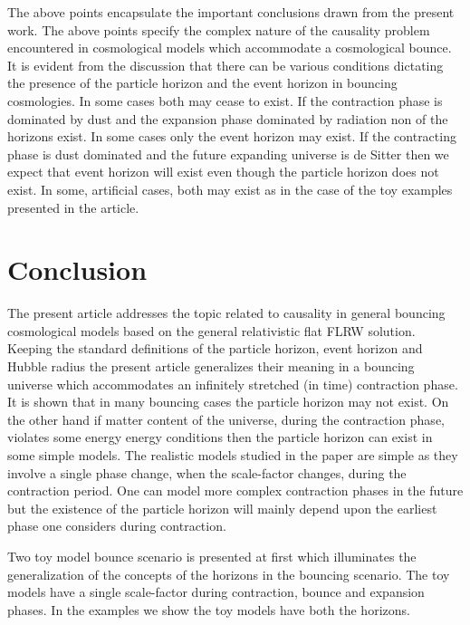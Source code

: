 \documentclass[24pt]{article}
\begin{document}
The above points encapsulate the important conclusions drawn from the
present work. The above points specify the complex nature of the
causality problem encountered in cosmological models which accommodate
a cosmological bounce. It is evident from the discussion that there
can be various conditions dictating the presence of the particle
horizon and the event horizon in bouncing cosmologies. In some cases
both may cease to exist. If the contraction phase is dominated by dust
and the expansion phase dominated by radiation non of the horizons
exist. In some cases only the event horizon may exist.  If the
contracting phase is dust dominated and the future expanding universe
is de Sitter then we expect that event horizon will exist even though
the particle horizon does not exist. In some, artificial cases, both
may exist as in the case of the toy examples presented in the article.
\section{Conclusion}

The present article addresses the topic related to causality in
general bouncing cosmological models based on the general relativistic
flat FLRW solution.  Keeping the standard definitions of the particle
horizon, event horizon and Hubble radius the present article
generalizes their meaning in a bouncing universe which accommodates an
infinitely stretched (in time) contraction phase.  It is shown that in
many bouncing cases the particle horizon may not exist. On the other
hand if matter content of the universe, during the contraction phase,
violates some energy energy conditions then the particle horizon can
exist in some simple models. The realistic models studied in the paper
are simple as they involve a single phase change, when the
scale-factor changes, during the contraction period. One can model
more complex contraction phases in the future but the existence of the
particle horizon will mainly depend upon the earliest phase one
considers during contraction.

Two toy model bounce scenario is presented at first which illuminates
the generalization of the concepts of the horizons in the bouncing
scenario. The toy models have a single scale-factor during
contraction, bounce and expansion phases. In the examples we show 
the toy models have both the horizons. 
\end{document}
